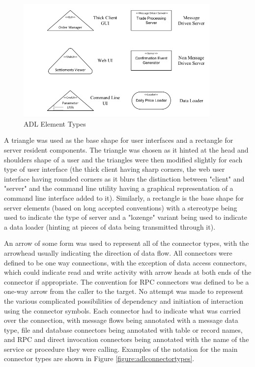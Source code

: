 \begin{figure}
\centering
\includegraphics[width=10cm]{Figures/adls-figure2}
\caption{ADL Element Types}
\label{figure:adlelementtypes}
\end{figure}  


  A triangle was used as the base shape for user interfaces and a rectangle for server resident components.  The triangle was chosen as it hinted at the head and shoulders shape of a user and the triangles were then modified slightly for each type of user interface (the thick client having sharp corners, the web user interface having rounded corners as it blurs the distinction between "client" and "server" and the command line utility having a graphical representation of a command line interface added to it).  Similarly, a rectangle is the base shape for server elements (based on long accepted conventions) with a stereotype being used to indicate the type of server and a "lozenge" variant being used to indicate a data loader (hinting at pieces of data being transmitted through it).

  An arrow of some form was used to represent all of the connector types, with the arrowhead usually indicating the direction of data flow.  All connectors were defined to be one way connections, with the exception of data access connectors, which could indicate read and write activity with arrow heads at both ends of the connector if appropriate.  The convention for RPC connectors was defined to be a one-way arrow from the caller to the target.  No attempt was made to represent the various complicated possibilities of dependency and initiation of interaction using the connector symbols.  Each connector had to indicate what was carried over the connection, with message flows being annotated with a message data type, file and database connectors being annotated with table or record names, and RPC and direct invocation connectors being annotated with the name of the service or procedure they were calling.  Examples of the notation for the main connector types are shown in Figure \ref{figure:adlconnectortypes}. 

